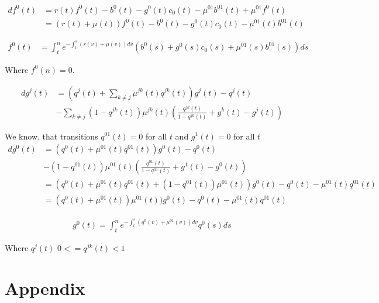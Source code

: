 \documentclass[12pt]{article}
\begin{document}
\begin{equation}
\begin{split}
df^0(t) & = r(t)f^0(t) - b^0(t) - g^0(t)c_0(t) - \mu^{01}b^{01}(t) + \mu^{01}f^0(t)
\\ & = (r(t) + \mu(t))f^0(t) - b^0(t) - g^0(t)c_0(t) - \mu^{01}(t)b^{01}(t)
\end{split}
\end{equation}

\begin{equation}
\begin{split}
f^0(t) & = \int_t^n e^{-\int_t^s(r(v)+\mu(v))dv} (b^0(s) + g^0(s)c_0(s) + \mu^{01}(s)b^{01}(s))ds
\end{split}
\end{equation}

Where $f^0(n) = 0$.

\begin{equation}
\begin{split}
dg^j(t) & = (q^j(t) + \sum_{k\neq j}
\mu^{jk}(t) q^{jk}(t)) g^j(t) -q^j(t) \\
& - \sum_{k\neq j}(1-q^{jk}(t))\mu^{jk}(t)(\frac{q^{jk}(t)}{1-q^{jk}(t)}+g^k(t)-g^j(t))
\end{split}
\end{equation}

We know, that transitions $q^{01}(t) = 0$ for all $t$ and $g^1(t) = 0$ for all $t$
\begin{equation}
\begin{split}
dg^0(t) & = (q^0(t) + 
\mu^{01}(t) q^{01}(t)) g^0(t) -q^0(t) \\
& - (1-q^{01}(t))\mu^{01}(t)(\frac{q^{01}(t)}{1-q^{01}(t)}+g^1(t)-g^0(t)) \\
& = (q^0(t) + \mu^{01}(t) q^{01}(t) + (1-q^{01}(t))\mu^{01}(t)) g^0(t) -q^0(t) - \mu^{01}(t)q^{01}(t) \\
& = (q^0(t) + \mu^{01}(t))\mu^{01}(t)) g^0(t) -q^0(t) - \mu^{01}(t)q^{01}(t) 
\end{split}
\end{equation}

\begin{equation}
\begin{split}
g^0(t) = \int_t^n e^{-\int_t^s(q^0(v) + \mu^{01}(v))dv} q^0(s)ds
\end{split}
\end{equation}

Where $q^j(t)$ $0 <= q^{jk}(t) < 1$

\newpage

\section{Appendix}
\end{document}
